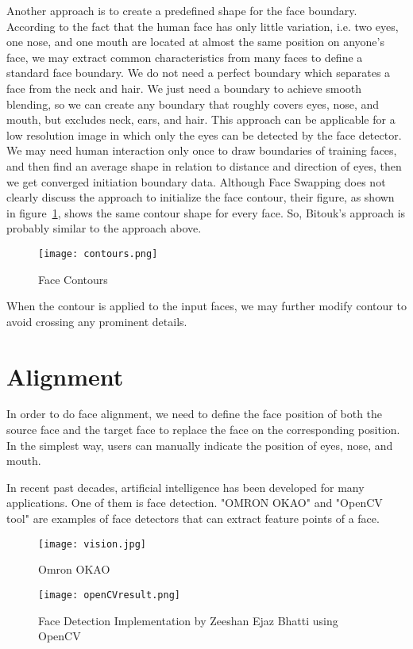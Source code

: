 Another approach is to create a predefined shape for the face boundary. According to the fact that the human face has only little variation, i.e. two eyes, one nose, and one mouth are located at almost the same position on anyone's face, we may extract common characteristics from many faces to define a standard face boundary. We do not need a perfect boundary which separates a face from the neck and hair. We just need a boundary to achieve smooth blending, so we can create any boundary that roughly covers eyes, nose, and mouth, but excludes neck, ears, and hair. This approach can be applicable for a low resolution image in which only the eyes can be detected by the face detector. We may need human interaction only once to draw boundaries of training faces, and then find an average shape in relation to distance and direction of eyes, then we get converged initiation boundary data. Although Face Swapping \cite{Bitouk2008} does not clearly discuss the approach to initialize the face contour, their figure, as shown in figure~\ref{fig:Contours}, shows the same contour shape for every face. So, Bitouk's approach is probably similar to the approach above.

\begin{figure}[htb]
   \centering
   \texttt{[image: contours.png]}
   \caption{Face Contours}
   \label{fig:Contours}
\end{figure}

When the contour is applied to the input faces, we may further modify contour to avoid crossing any prominent details.


\section{Alignment}
\hspace{0.5in}In order to do face alignment, we need to define the face position of both the source face and the target face to replace the face on the corresponding position. In the simplest way, users can manually indicate the position of eyes, nose, and mouth.

In recent past decades, artificial intelligence has been developed for many applications. One of them is face detection. "OMRON OKAO" and "OpenCV tool" are examples of face detectors that can extract feature points of a face.

\begin{figure}[htb]
   \centering
   \texttt{[image: vision.jpg]}
   \caption{Omron OKAO}
   \label{fig:Omron}
\end{figure}
\begin{figure}[htb]
   \centering
   \texttt{[image: openCVresult.png]}
   \caption{Face Detection Implementation by Zeeshan Ejaz Bhatti using OpenCV}
   \label{fig:OpenCV}
\end{figure}

